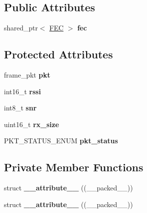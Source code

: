 \subsection*{Public Attributes}
\begin{DoxyCompactItemize}
\item 
\mbox{\label{classFrame_a0a718492a654222c71e8ff0b8e06fb8a}} 
shared\+\_\+ptr$<$ \hyperlink{classFEC}{F\+EC} $>$ {\bfseries fec}
\end{DoxyCompactItemize}
\subsection*{Protected Attributes}
\begin{DoxyCompactItemize}
\item 
\mbox{\label{classFrame_a759fe5f07a329e7bff5bdd2c1620f7b0}} 
frame\+\_\+pkt {\bfseries pkt}
\item 
\mbox{\label{classFrame_ab7a6e2ca6c4b411ff1f2152ec1261539}} 
int16\+\_\+t {\bfseries rssi}
\item 
\mbox{\label{classFrame_a0bac5a6c745a0464b506884fe7ce4de4}} 
int8\+\_\+t {\bfseries snr}
\item 
\mbox{\label{classFrame_a4f9076d957cbace63b33dea31746f266}} 
uint16\+\_\+t {\bfseries rx\+\_\+size}
\item 
\mbox{\label{classFrame_adfe9288bf669e9ae08f61fa18b82c47f}} 
P\+K\+T\+\_\+\+S\+T\+A\+T\+U\+S\+\_\+\+E\+N\+UM {\bfseries pkt\+\_\+status}
\end{DoxyCompactItemize}
\subsection*{Private Member Functions}
\begin{DoxyCompactItemize}
\item 
\mbox{\label{classFrame_a1c9286c3bbd1c0393baefa0ee4120a04}} 
struct {\bfseries \+\_\+\+\_\+attribute\+\_\+\+\_\+} ((\+\_\+\+\_\+packed\+\_\+\+\_\+))
\item 
\mbox{\label{classFrame_a1c9286c3bbd1c0393baefa0ee4120a04}} 
struct {\bfseries \+\_\+\+\_\+attribute\+\_\+\+\_\+} ((\+\_\+\+\_\+packed\+\_\+\+\_\+))
\end{DoxyCompactItemize}

